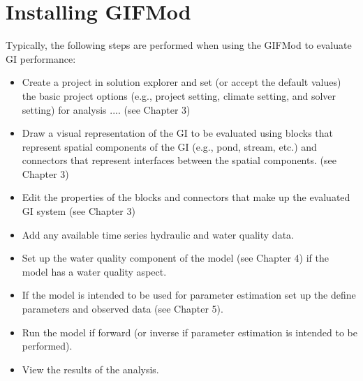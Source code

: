 \section{Installing GIFMod}


Typically, the following steps are performed when using the GIFMod to evaluate GI performance:

\begin{itemize}
    \item Create a project in solution explorer and set (or accept the default values) the basic project options (e.g., project setting, climate setting, and solver setting) for analysis .... (see Chapter 3)
    \item Draw a visual representation of the GI to be evaluated using blocks that represent spatial components of the GI (e.g., pond, stream, etc.) and connectors that represent interfaces between the spatial components. (see Chapter 3)
    \item Edit the properties of the blocks and connectors that make up the evaluated GI system (see Chapter 3)
    \item Add any available time series hydraulic and water quality data.
    \item Set up the water quality component of the model (see Chapter 4) if the model has a water quality aspect.
    \item If the model is intended to be used for parameter estimation set up the define parameters and observed data (see Chapter 5). 
    \item Run the model if forward (or inverse if parameter estimation is intended to be performed). 
    \item View the results of the analysis.
 
\end{itemize}
    




